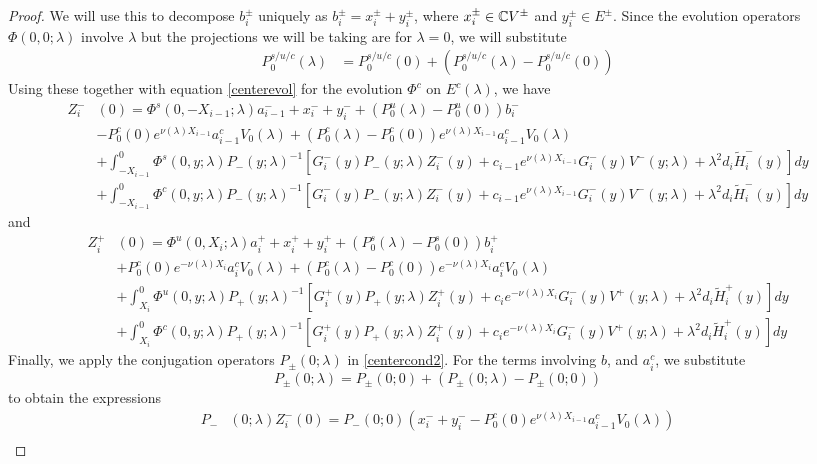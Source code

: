 \documentclass[thesis.tex]{subfiles}
\begin{document}
\begin{lemma}
\begin{proof}
We will use this to decompose $b_i^\pm$ uniquely as $b_i^\pm = x_i^\pm + y_i^\pm$, where $x_i^\pm \in \mathbb{C} V^\pm$ and $y_i^\pm \in E^\pm$. Since the evolution operators $\Phi(0, 0; \lambda)$ involve $\lambda$ but the projections we will be taking are for $\lambda = 0$, we will substitute
\begin{align*}
P_0^{s/u/c}(\lambda) &= P_0^{s/u/c}(0) + (P_0^{s/u/c}(\lambda) - P_0^{s/u/c}(0)) 
\end{align*}
Using these together with equation \eqref{centerevol} for the evolution $\Phi^c$ on $E^c(\lambda)$, we have
\begin{align*}
Z_i^-&(0) = \Phi^s(0, -X_{i-1}; \lambda) a_{i-1}^- + x_i^- + y_i^- + (P_0^u(\lambda) - P_0^u(0))b_i^- \\
&- P_0^c(0) e^{\nu(\lambda) X_{i-1}} a_{i-1}^c V_0(\lambda) + (P_0^c(\lambda) - P_0^c(0)) e^{\nu(\lambda) X_{i-1}} a_{i-1}^c V_0(\lambda) \\
&+ \int_{-X_{i-1}}^0 \Phi^s(0, y; \lambda) P_-(y; \lambda)^{-1} [ G_i^-(y) P_-(y; \lambda) Z_i^-(y) + c_{i-1} e^{\nu(\lambda)X_{i-1}} G_i^-(y) V^-(y; \lambda) + \lambda^2 d_i \tilde{H}_i^-(y)] dy \\
&+ \int_{-X_{i-1}}^0 \Phi^c(0, y; \lambda) P_-(y; \lambda)^{-1} [ G_i^-(y) P_-(y; \lambda) Z_i^-(y) + c_{i-1} e^{\nu(\lambda)X_{i-1}} G_i^-(y) V^-(y; \lambda) + \lambda^2 d_i \tilde{H}_i^-(y)] dy
\end{align*}
and
\begin{align*} 
Z_i^+&(0) = \Phi^u(0, X_i; \lambda) a_i^+ + x_i^+ + y_i^+ + (P_0^s(\lambda) - P_0^s(0)) b_i^+ \\
&+ P_0^c(0) e^{-\nu(\lambda)X_i} a_i^c V_0(\lambda) + (P_0^c(\lambda) - P_0^c(0)) e^{-\nu(\lambda)X_i} a_i^c V_0(\lambda) \\
&+ \int_{X_i}^0 \Phi^u(0, y; \lambda) P_+(y; \lambda)^{-1}[ G_i^+(y) P_+(y; \lambda) Z_i^+(y) + c_i e^{-\nu(\lambda)X_i} G_i^-(y) V^+(y; \lambda) + \lambda^2 d_i \tilde{H}_i^+(y)] dy \\
&+ \int_{X_i}^0 \Phi^c(0, y; \lambda) P_+(y; \lambda)^{-1}[ G_i^+(y) P_+(y; \lambda) Z_i^+(y) + c_i e^{-\nu(\lambda)X_i} G_i^-(y) V^+(y; \lambda) + \lambda^2 d_i \tilde{H}_i^+(y)] dy 
\end{align*}
Finally, we apply the conjugation operators $P_\pm(0; \lambda)$ in \eqref{centercond2}. For the terms involving $b$, and $a_i^c$, we substitute
\[
P_\pm(0; \lambda) = P_\pm(0; 0) + (P_\pm(0; \lambda) - P_\pm(0; 0))
\]
to obtain the expressions
\begin{align*}
P_-&(0; \lambda) Z_i^-(0) = P_-(0; 0)( x_i^- + y_i^- - P_0^c(0) e^{\nu(\lambda) X_{i-1}} a_{i-1}^c V_0(\lambda) ) \\

\end{align*}
\end{proof}
\end{lemma}
\end{document}
